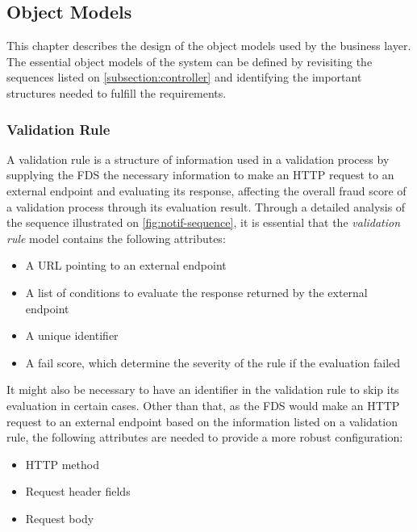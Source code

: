 \subsection{Object Models}
  \label{subsection:model}

  This chapter describes the design of the object models used by the business layer. The essential object models of the system can be defined by revisiting the sequences listed on \autoref{subsection:controller} and identifying the important structures needed to fulfill the requirements.
  
  \subsubsection{Validation Rule}
    \label{subsub:rule}

    A validation rule is a structure of information used in a validation process by supplying the FDS the necessary information to make an HTTP request to an external endpoint and evaluating its response, affecting the overall fraud score of a validation process through its evaluation result. Through a detailed analysis of the sequence illustrated on \autoref{fig:notif-sequence}, it is essential that the \emph{validation rule} model contains the following attributes:

    \begin{itemize}
      \item A URL pointing to an external endpoint
      \item A list of conditions to evaluate the response returned by the external endpoint
      \item A unique identifier
      \item A fail score, which determine the severity of the rule if the evaluation failed
    \end{itemize}

    It might also be necessary to have an identifier in the validation rule to skip its evaluation in certain cases. Other than that, as the FDS would make an HTTP request to an external endpoint based on the information listed on a validation rule, the following attributes are needed to provide a more robust configuration:

    \begin{itemize}
      \item HTTP method 
      \item Request header fields
      \item Request body
    \end{itemize}

